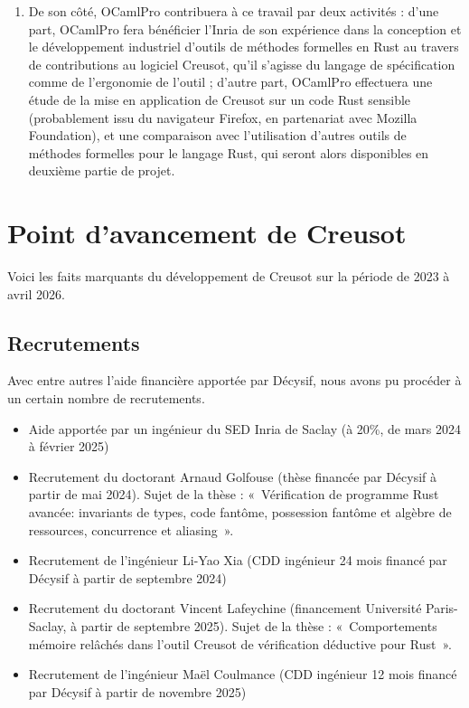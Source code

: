\documentclass[a4paper,11pt]{article}
\begin{document}
\begin{enumerate}
\item De son côté, OCamlPro contribuera à ce travail par deux activités : d’une
  part, OCamlPro fera bénéficier l’Inria de son expérience dans la conception et
  le développement industriel d’outils de méthodes formelles en Rust au travers
  de contributions au logiciel Creusot, qu’il s’agisse du langage de
  spécification comme de l’ergonomie de l’outil ; d’autre part, OCamlPro
  effectuera une étude de la mise en application de Creusot sur un code Rust
  sensible (probablement issu du navigateur Firefox, en partenariat avec Mozilla
  Foundation), et une comparaison avec l’utilisation d’autres outils de méthodes
  formelles pour le langage Rust, qui seront alors disponibles en deuxième
  partie de projet.
\end{enumerate}


\section{Point d'avancement de Creusot}

Voici les faits marquants du développement de Creusot sur la période de 2023 à
avril 2026.

\subsection{Recrutements}

Avec entre autres l'aide financière apportée par Décysif, nous avons pu procéder
à un certain nombre de recrutements.
\begin{itemize}
\item Aide apportée par un ingénieur du SED Inria de Saclay (à 20\%, de mars
  2024 à février 2025)
\item Recrutement du doctorant Arnaud Golfouse (thèse financée par Décysif à
  partir de mai 2024). Sujet de la thèse : «~Vérification de programme Rust avancée:
  invariants de types, code fantôme, possession fantôme et algèbre de
  ressources, concurrence et aliasing~».
\item Recrutement de l'ingénieur Li-Yao Xia (CDD ingénieur 24 mois financé par
  Décysif à partir de septembre 2024)
\item Recrutement du doctorant Vincent Lafeychine (financement Université
  Paris-Saclay, à partir de septembre 2025). Sujet de la thèse : «~Comportements
  mémoire relâchés dans l'outil Creusot de vérification déductive pour Rust~».
\item Recrutement de l'ingénieur Maël Coulmance (CDD ingénieur 12 mois financé
  par Décysif à partir de novembre 2025)
\end{itemize}
\end{document}
